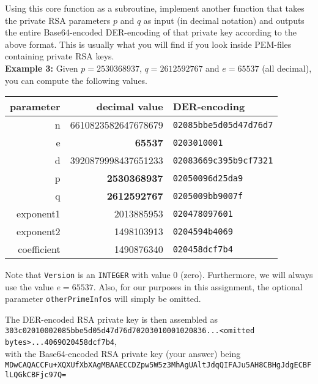 \documentclass{article}
\begin{document}
\begin{description}
{				Using this core function as a subroutine, implement another function that takes the private RSA parameters $p$ and $q$ as input (in decimal notation) and outputs the entire Base64-encoded DER-encoding of that private key according to the above format. This is usually what you will find if you look inside PEM-files containing private RSA keys.\\
				
				\textbf{Example 3:} Given $p=2530368937$, $q=2612592767$ and $e=65537$ (all decimal), you can compute the following values.\\
				\begin{center}
					\begin{tabular}{rrl}
						parameter & decimal value & DER-encoding\\\hline
						n & 6610823582647678679 & \verb!02085bbe5d05d47d76d7!\\
						e & \textbf{65537} & \verb!0203010001!\\
						d & 3920879998437651233 & \verb!02083669c395b9cf7321!\\
						p & \textbf{2530368937} & \verb!02050096d25da9!\\
						q & \textbf{2612592767} & \verb!0205009bb9007f!\\
						exponent1 & 2013885953 & \verb!020478097601!\\
						exponent2 & 1498103913 & \verb!0204594b4069!\\
						coefficient & 1490876340 & \verb!020458dcf7b4!
					\end{tabular}
				\end{center}
				
				Note that \verb!Version! is an \verb!INTEGER! with value $0$ (zero). Furthermore, we will always use the value $e=65537$. Also, for our purposes in this assignment, the optional parameter \verb!otherPrimeInfos! will simply be omitted.
				
				The DER-encoded RSA private key is then assembled as\\
				
				\verb!303c02010002085bbe5d05d47d76d70203010001020836...<omitted bytes>...4069020458dcf7b4!,\\
				
				with the Base64-encoded RSA private key (your answer) being\\
				
				\verb!MDwCAQACCFu+XQXUfXbXAgMBAAECCDZpw5W5z3MhAgUAltJdqQIFAJu5AH8CBHgJdgECBFlLQGkCBFjc97Q=!\\
				
}
\end{description}
\end{document}
